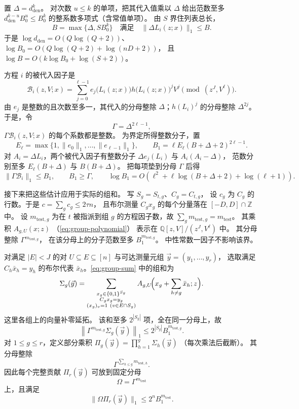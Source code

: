 置 $\Delta=d_{\mathrm{den}}^k$。
对次数 $u\le k$ 的单项，把其代入值乘以 $\Delta$
给出范数至多 $d_{\mathrm{den}}^{k-u}B_0^u\le B_0^k$
的整系数多项式（含常值单项）。
由 $S$ 界住列表总长，
\[
 B=\max\{\Delta,SB_0^k\}
 \quad\text{满足}\quad \|\Delta L_i(z;x)\|_1\le B .
\]
于是 $\log d_{\mathrm{den}}=O(Q\log(Q+2))$、
$\log B_0=O(Q\log(Q+2)+\log(nD+2))$，
且 $\log B=O(k\log B_0+\log(S+2))$。

方程 $i$ 的被代入因子是
\[
 \mathcal B_i(z,V;x)=\sum_{j=0}^{\ell-1}
       e_j\bigl(L_i(z;x)\bigr)h\bigl(L_i(z;x)\bigr)^jV^j
       \pmod{(z^J,V^\ell)}.
\]
由 $e_j$ 是整数的且次数至多一，其代入的分母整除
$\Delta$；$h(L_i)^j$ 的分母整除 $\Delta^{2j}$。
于是，令
\[
 \Gamma=\Delta^{2\ell-1},
\]
$\Gamma\mathcal B_i(z,V;x)$ 的每个系数都是整数。
为界定所得整数分子，置
\[
 E_\ell=\max\{1,\|e_0\|_1,\ldots,\|e_{\ell-1}\|_1\},\qquad
 B_1=\ell E_\ell(B+\Delta+2)^{2\ell-1}.
\]
对 $A_i=\Delta L_i$，两个被代入因子有整数分子
$\Delta e_j(L_i)$ 与 $A_i(A_i-\Delta)$，
范数分别至多 $E_\ell(B+\Delta)$ 与 $B(B+\Delta)$。
把每项垫到分母 $\Gamma$ 后得
\[
 \|\Gamma\mathcal B_i\|_1\le B_1,\qquad B_1\ge\Gamma,
 \qquad
 \log B_1=O\!\left(\ell^2+
       \ell\log(B+\Delta+2)+\log(\ell+1)\right).
\]

接下来把这些估计应用于实际的组和。
写 $S_g=S_{t,g}$、$C_g=C_{t,g}$，
设 $c_g$ 为 $C_g$ 的行数。于是
$c=\sum_g c_g\le2\tau n$，
且布尔测量 $C_gx_g$ 的每个分量落在
$[-D,D]\cap\mathbb Z$ 中。
设 $m_{\mathrm{test},g}$ 为在 $t$ 被指派到组 $g$
的方程因子数，故
$\sum_g m_{\mathrm{test},g}=m_{\mathrm{test}}$。
其乘积 $A_{g,U}(x;z)$
（\eqref{eq:group-polynomial}）
表示在 $\mathbb Q[z,V]/(z^J,V^\ell)$ 中。
其分母整除 $\Gamma^{m_{\mathrm{test},g}}$，
在该分母上的分子范数至多
$B_1^{m_{\mathrm{test},g}}$。
中性常数一因子不影响该界。

对满足 $|E|<J$ 的对 $U\subseteq E\subseteq[n]$
与可达测量元组 $\vec y=(y_1,\ldots,y_r)$，
选取满足 $C_h\bar x_h=y_h$ 的布尔代表
$\bar x_h$。\eqref{eq:group-sum} 中的组和为
\[
 \Sigma_g(\vec y)=
 \sum_{\substack{x_g\in\{0,1\}^{S_g}\\ C_gx_g=y_g\\
                  (x_g)_v=1\ (v\in E\cap S_g)}}
 A_{g,U}\!\Bigl(x_g+\sum_{h\ne g}\bar x_h;z\Bigr).
\]
这里各组上的向量补零延拓。
该和至多 $2^{|S_g|}$ 项，全在同一分母上，故
\[
 \left\|\Gamma^{m_{\mathrm{test},g}}\Sigma_g(\vec y)\right\|_1
 \le 2^{|S_g|}B_1^{m_{\mathrm{test},g}}.
\]
对 $1\le g\le r$，定义部分乘积
$\Pi_g(\vec y)=\prod_{h=1}^g\Sigma_h(\vec y)$
（每次乘法后截断）。
其分母整除
\[
 \Gamma^{\sum_{h\le g}m_{\mathrm{test},h}}.
\]
因此每个完整贡献 $\Pi_r(\vec y)$
可放到固定分母
\[
 \Omega=\Gamma^{m_{\mathrm{test}}}
\]
上，且满足
\[
 \|\Omega\Pi_r(\vec y)\|_1
 \le2^nB_1^{m_{\mathrm{test}}}.
\]

